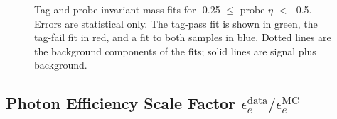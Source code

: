 \documentclass[dissertation.tex]{subfiles}
\begin{document}
\begin{figure}
	\centering
	\hspace{1cm}
	\caption{Tag and probe invariant mass fits for -0.25 $\leq$ probe $\eta$ $<$ -0.5.  Errors are statistical only.  The tag-pass fit is shown in green, the tag-fail fit in red, and a fit to both samples in blue.  Dotted lines are the background components of the fits; solid lines are signal plus background.}
	\label{fig:mid-eta_bin}
\end{figure}

\subsection{Photon Efficiency Scale Factor $\epsilon_{e}^{\mathrm{data}}/\epsilon_{e}^{\mathrm{MC}}$}
\label{sec:Photon_Efficiency_Scale_Factor}
\end{document}

